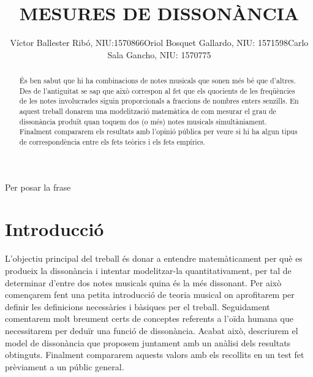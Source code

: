 \documentclass{article}
\title{\bfseries\large MESURES DE DISSONÀNCIA}
\author{Víctor Ballester Ribó, NIU:1570866\endgraf Oriol Bosquet Gallardo, NIU: 1571598\endgraf Carlo Sala Gancho, NIU: 1570775}
\date{\parbox{\linewidth}{\centering
  Taller de modelització\endgraf
  Grau en Matemàtiques\endgraf
  Universitat Autònoma de Barcelona\endgraf
  Juny de 2021}}
\theoremstyle{math}
\theoremstyle{TheoremNum}
\newcommand{\0}{\ensuremath{\vb{0}}}
\begin{document}
\maketitle
{}
\begin{abstract}
    És ben sabut que hi ha combinacions de notes musicals que sonen més bé que d'altres. Des de l'antiguitat se sap que això correspon al fet que els quocients de les freqüències de les notes involucrades siguin proporcionals a fraccions de nombres enters senzills. En aquest treball donarem una modelització matemàtica de com mesurar el grau de dissonància produït quan toquem dos (o més) notes musicals simultàniament. Finalment compararem els resultats amb l'opinió pública per veure si hi ha algun tipus de correspondència entre els fets teòrics i els fets empírics. 
\end{abstract}
\newpage
Per posar la frase
\newpage
\tableofcontents
\newpage
\section{Introducció}
L'objectiu principal del treball és donar a entendre matemàticament per què es produeix la dissonància i intentar modelitzar-la quantitativament, per tal de determinar d'entre dos notes musicals quina és la més dissonant. Per això començarem fent una petita introducció de teoria musical on aprofitarem per definir les definicions necessàries i bàsiques per el treball. Seguidament comentarem molt breument certs de conceptes referents a l'oïda humana que necessitarem per deduïr una funció de dissonància. Acabat això, descriurem el model de dissonància que proposem juntament amb un anàlisi dels resultats obtinguts. Finalment compararem aquests valors amb els recollits en un test fet prèviament a un públic general.
\end{document}
